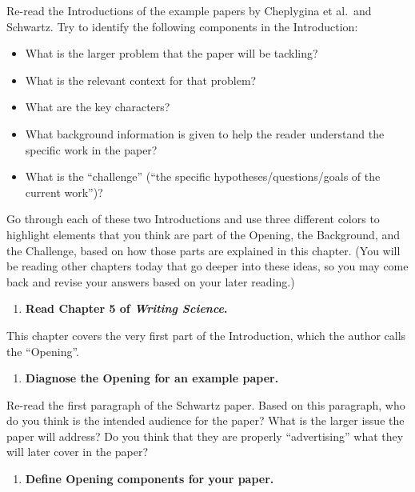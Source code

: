 \documentclass[]{tufte-book}
\providecommand{\tightlist}{%
  \setlength{\itemsep}{0pt}\setlength{\parskip}{0pt}}
\begin{document}
Re-read the Introductions of the example papers by Cheplygina et al.~and
Schwartz. Try to identify the following components in the Introduction:

\begin{itemize}
\tightlist
\item
  What is the larger problem that the paper will be tackling?
\item
  What is the relevant context for that problem?
\item
  What are the key characters?
\item
  What background information is given to help the reader understand
  the specific work in the paper?
\item
  What is the ``challenge'' (``the specific hypotheses/questions/goals of
  the current work'')?
\end{itemize}

Go through each of these two Introductions and use three different colors to
highlight elements that you think are part of the Opening, the Background, and
the Challenge, based on how those parts are explained in this chapter. (You will
be reading other chapters today that go deeper into these ideas, so you may come
back and revise your answers based on your later reading.)

\begin{enumerate}
\def\labelenumi{\arabic{enumi}.}
\setcounter{enumi}{3}
\tightlist
\item
  \textbf{Read Chapter 5 of \emph{Writing Science}.}
\end{enumerate}

This chapter covers the very first part of the Introduction, which the author
calls the ``Opening''.

\begin{enumerate}
\def\labelenumi{\arabic{enumi}.}
\setcounter{enumi}{4}
\tightlist
\item
  \textbf{Diagnose the Opening for an example paper.}
\end{enumerate}

Re-read the first paragraph of the Schwartz paper. Based on this paragraph, who
do you think is the intended audience for the paper? What is the larger issue
the paper will address? Do you think that they are properly ``advertising'' what
they will later cover in the paper?

\begin{enumerate}
\def\labelenumi{\arabic{enumi}.}
\setcounter{enumi}{5}
\tightlist
\item
  \textbf{Define Opening components for your paper.}
\end{enumerate}
\end{document}
